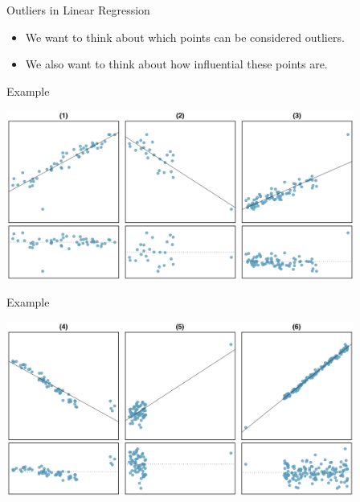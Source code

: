 \begin{frame}{Outliers in Linear Regression}
    \begin{itemize}
        \item We want to think about which points can be considered outliers.
        \item We also want to think about how influential these points are.
    \end{itemize}
\end{frame}

\begin{frame}{Example}
    \begin{center}
        \includegraphics[width=4.5in]{images/out1.png}
    \end{center}
\end{frame}

\begin{frame}{Example}
    \begin{center}
        \includegraphics[width=4.5in]{images/out2.png}
    \end{center}
\end{frame}

